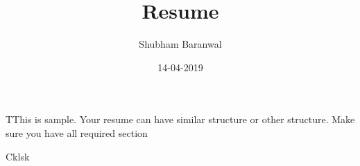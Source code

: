 \documentclass{article}
\title{Resume}
\date{14-04-2019}
\author{Shubham Baranwal}
\begin{document}
	\begin{title}
	TThis is sample. Your resume can have similar structure or other structure. Make sure you have all required section
	\end{title}
	\begin{center}
		Cklsk
	\end{center}
	\hrulefill
	
	
			\begin{figure}[h!] 
				
				\hfill{}	
			\end{figure}
	
\end{document}
